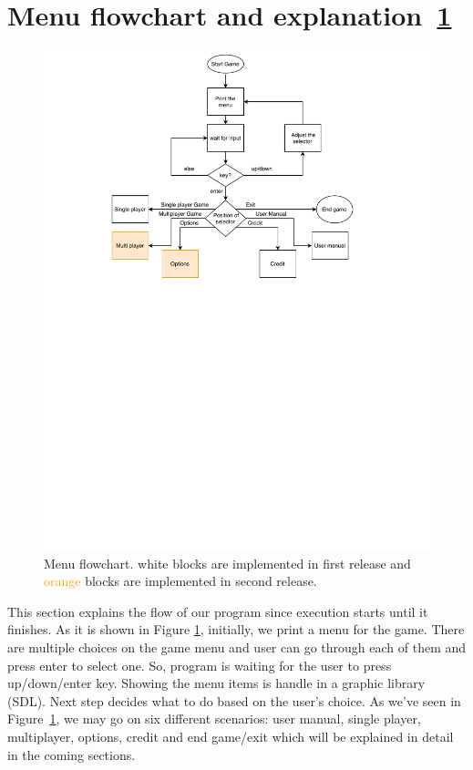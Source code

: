 \section{Menu flowchart and explanation~\ref{fig:menu}}
\begin{figure}
    \centering 
    \includegraphics[width=0.8\columnwidth]{menu.pdf}
    \caption{Menu flowchart. white blocks are implemented in first release and \textcolor{orange}{orange} blocks are implemented in second release. }
    \label{fig:menu}
\end{figure}

This section explains the flow of our program since execution starts until it finishes. 
As it is shown in Figure \ref{fig:menu}, initially, we print a menu for the game. There are multiple choices on the game menu and user can go through each of them and press enter to select one. So, program is waiting for the user to press up/down/enter key. Showing the menu items is handle in a graphic library (SDL).
Next step decides what to do based on the user's choice. 
As we've seen in Figure~\ref{fig:menu}, we may go on six different scenarios: user manual, single player, multiplayer, options, credit and end game/exit which will be explained in detail in the coming sections.

